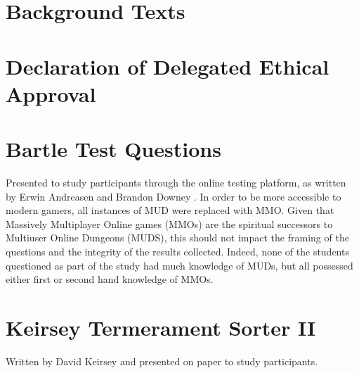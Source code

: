 \documentclass[12pt,a4paper,twoside]{report}
\begin{document}
\chapter{Background Texts}
\begin{appendices}
	
\chapter{Declaration of Delegated Ethical Approval}
\label{sec:bsrec}

	
\chapter{Bartle Test Questions}
\label{sec:bartle}
Presented to study participants through the online testing platform, as written by Erwin Andreasen and Brandon Downey \cite{bartle-questions}. In order to be more accessible to modern gamers, all instances of MUD were replaced with MMO. Given that Massively Multiplayer Online games (MMOs) are the spiritual successors to Multiuser Online Dungeons (MUDS), this should not impact the framing of the questions and the integrity of the results collected. Indeed, none of the students questioned as part of the study had much knowledge of MUDs, but all possessed either first or second hand knowledge of MMOs.
\linespread{1.0}

\linespread{1.3}

\chapter{Keirsey Termerament Sorter II}
\label{sec:keirsey}
Written by David Keirsey \cite{keirsey1998please} and presented on paper to study participants.

\end{appendices}



\end{document}
